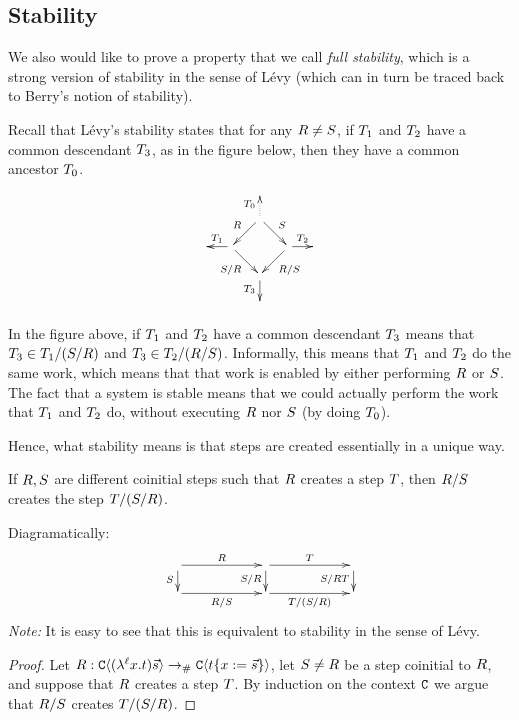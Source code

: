\bigskip
\subsection*{Stability}

We also would like to prove a property that we call \emph{full stability},
which is a strong version of stability in the sense of Lévy \cite{levy_redex_stability}
(which can in turn be traced back to Berry's notion of stability).

Recall that L\'evy's stability states that for any $R \neq S$,
if $T_1$ and $T_2$ have a common descendant $T_3$, as in the figure below,
then they have a common ancestor $T_0$.
\[
  \xymatrix@C=.5cm@R=.5cm{
    &&&
  \\
    &
    & \ar@{.>}[u]^{\redexthree_0} \ar[dl]_{\redex} \ar[dr]^{\redextwo} &
  \\
    &
    \ar[l]_{\redexthree_1}
    \ar[dr]_{\redextwo/\redex} & & \ar[dl]^{\redex/\redextwo} \ar[r]^{\redexthree_2} &
  \\
    &
    & \ar[d]_{\redexthree_3} &
  \\
    &&&
  }
\]

In the figure above, if $T_1$ and $T_2$ have a common descendant
$T_3$ means that $T_3 \in T_1 / (S / R)$
and $T_3 \in T_2 / (R / S)$.
Informally, this means that $T_1$ and $T_2$ do the same work,
which means that that work is enabled by either performing $R$ or $S$.
The fact that a system is stable means that we could actually perform the work that
$T_1$ and $T_2$ do, without executing $R$ nor $S$
(by doing $T_0$).

Hence, what stability means is that steps are created essentially in a unique way.


\begin{lemma}[Stability]
If $R,S$ are different coinitial steps such that
$R$ creates a step $T$,
then $R/S$ creates the step $T/(S/R)$.

Diagramatically:
\[
  \xymatrix@R=.5cm@C=2cm{
    \ar[r]^{\redex}
    \ar[d]_{\redextwo}
    &
    \ar[r]^{\redexthree}
    \ar[d]_{\redextwo/\redex}
    &
    \ar[d]_{\redextwo/\redex\redexthree}
  \\
    \ar[r]_{\redex/\redextwo}
    &
    \ar[r]_{\redexthree/(\redextwo/\redex)}
    &
  }
\]
\emph{Note:} It is easy to see that this is equivalent to stability in the sense of Lévy.
\end{lemma}
\begin{proof}
Let $R : \mathtt{C}\langle(\lambda^{\ell} x. t)\vec{s}\rangle \mathrel{\to_{\mathtt{\#}}} \mathtt{C}\langle t\{x := \vec{s}\}\rangle$,
let $S \neq R$ be a step coinitial to $R$,
and suppose that $R$ creates a step $T$.
By induction on the context $\mathtt{C}$ we argue that $R/S$ creates $T/(S/R)$.
\end{proof}

